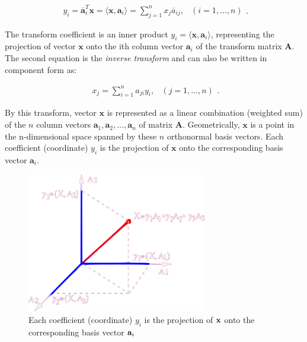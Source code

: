 \documentclass[10pt,b5paper,titlepage]{book}
\begin{document}
\begin{equation}
    \begin{array}{lr}
        y_{i} = \overline{\mathbf{a}}_{i}^{T} \mathbf{x}
        = \langle \mathbf{x}, \mathbf{a}_{i} \rangle
        = \sum_{j=1}^{n} x_{j} \overline{a}_{ij}, & (i = 1, \dots, n)
    \end{array}
.\end{equation}

The transform coefficient is an inner product $y_i = \langle \mathbf{x}, \mathbf{a}_i \rangle$, representing the projection of vector $\mathbf{x}$ onto the ith column vector  $\mathbf{a}_i$ of the transform matrix $\mathbf{A}$. The second equation is the \textit{inverse transform} and can also be written in component form as:

\begin{equation}
    \begin{array}{lr}
        x_j = \sum_{i=1}^{n} a_{ji} y_{i}, & (j = 1, \dots, n)
    \end{array}
.\end{equation}

By this transform, vector $\mathbf{x}$ is represented as a linear combination (weighted sum) of the $n$ column vectors  $\mathbf{a}_1, \mathbf{a}_2, \dots, \mathbf{a}_n$ of matrix $\mathbf{A}$. Geometrically,  $\mathbf{x}$ is a point in the n-dimensional space spanned by these $n$ orthonormal basis vectors. Each coefficient (coordinate)  $y_i$ is the projection of  $\mathbf{x}$ onto the corresponding basis vector $\mathbf{a}_i$.

\begin{figure}[htpb]
    \centering
    \includegraphics[width=0.7\textwidth]{./img/unitary_transform_1_inv}
    \caption[Unitary transform]{Each coefficient (coordinate) $y_i$ is the projection of ${\bf x}$ onto the corresponding basis vector ${\bf a}_i$}
    \label{fig:unitary_transform_1}
\end{figure}
\end{document}
